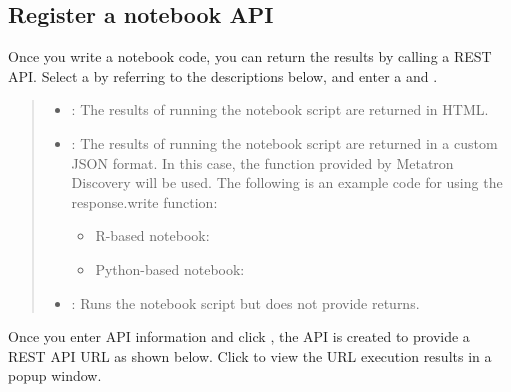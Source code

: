 \documentclass[letterpaper,10pt,english]{sphinxmanual}
\begin{document}
\subsection{Register a notebook API}
\label{\detokenize{discovery/part05/use_a_notebook:api}}
Once you write a notebook code, you can return the results by calling a REST API. Select a  by referring to the descriptions below, and enter a  and .
\begin{quote}

\begin{figure}[H]
\centering

\noindent{}
\end{figure}
\begin{itemize}
\item {} 
: The results of running the notebook script are returned in HTML.

\item {} 
: The results of running the notebook script are returned in a custom JSON format. In this case, the  function provided by Metatron Discovery will be used. The following is an example code for using the response.write function:
\begin{itemize}
\item {} 
R-based notebook: 

\item {} 
Python-based notebook: 

\end{itemize}

\item {} 
: Runs the notebook script but does not provide returns.

\end{itemize}
\end{quote}

Once you enter API information and click , the API is created to provide a REST API URL as shown below. Click  to view the URL execution results in a popup window.
\begin{quote}

\begin{figure}[H]
\centering

\noindent{}
\end{figure}
\end{quote}
\end{document}

